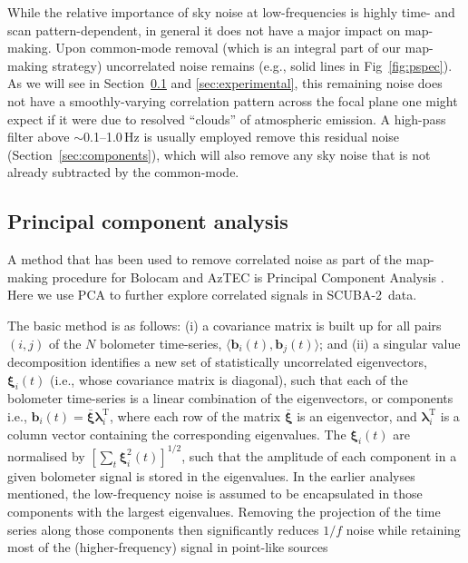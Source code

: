 \documentclass[useAMS,usenatbib,nofootinbib]{mn2e}
\newcommand{\scuba}{SCUBA-2}
\begin{document}
While the relative importance of sky noise at low-frequencies is
highly time- and scan pattern-dependent, in general it does not have a
major impact on map-making. Upon common-mode removal (which is an
integral part of our map-making strategy) uncorrelated noise remains
(e.g., solid lines in Fig~\ref{fig:pspec}). As we will see in
Section~\ref{sec:pca} and \ref{sec:experimental}, this remaining noise
does not have a smoothly-varying correlation pattern across the focal
plane one might expect if it were due to resolved ``clouds'' of
atmospheric emission. A high-pass filter above $\sim$0.1--1.0\,Hz is
usually employed remove this residual noise
(Section~\ref{sec:components}), which will also remove any sky noise
that is not already subtracted by the common-mode.

\subsection{Principal component analysis}
\label{sec:pca}

A method that has been used to remove correlated noise as part of the
map-making procedure for Bolocam and AzTEC is Principal Component
Analysis \citep[PCA,][]{laurent2005,scott2008,perera2008}. Here we use
PCA to further explore correlated signals in \scuba\ data.

The basic method is as follows: (i) a covariance matrix is built up
for all pairs $(i,j)$ of the $N$ bolometer time-series,
$\langle\mathbf{b}_i(t),\mathbf{b}_j(t)\rangle$; and (ii) a singular
value decomposition identifies a new set of statistically uncorrelated
eigenvectors, $\mathbf{\xi}_i(t)$ (i.e., whose covariance matrix is
diagonal), such that each of the bolometer time-series is a linear
combination of the eigenvectors, or components i.e., $\mathbf{b}_i(t)
= \bar{\mathbf{\xi}} \mathbf{\lambda}_i^\mathrm{T}$, where each row of
the matrix $\bar{\mathbf{\xi}}$ is an eigenvector, and
$\mathbf{\lambda}_i^\mathrm{T}$ is a column vector containing the
corresponding eigenvalues. The $\mathbf{\xi}_i(t)$ are normalised by
$[\sum_t \mathbf{\xi}_i^2(t)]^{1/2}$, such that the amplitude of each
component in a given bolometer signal is stored in the eigenvalues. In
the earlier analyses mentioned, the low-frequency noise is assumed to
be encapsulated in those components with the largest
eigenvalues. Removing the projection of the time series along those
components then significantly reduces $1/f$ noise while retaining most
of the (higher-frequency) signal in point-like sources
\end{document}
